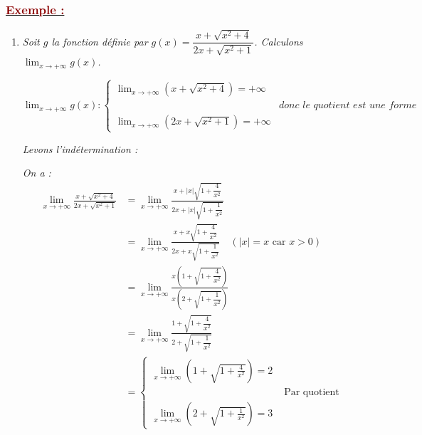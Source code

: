 \documentclass[12pt,a4paper]{article}
\begin{document}
\subsubsection*{\underline{\textcolor{darkred}{ Exemple : }}}
\begin{enumerate}
\item \textit{Soit $g$ la fonction définie par $g(x) = \dfrac{x + \sqrt{x^2 + 4}}{2x + \sqrt{x^2 + 1}}$. Calculons $\displaystyle \lim_{x \to +\infty} g(x)$.}
    
    \vspace{0.1cm}
    
    $
    \displaystyle \lim_{x \to +\infty} g(x):
    \begin{cases}
    \displaystyle \lim_{x \to +\infty} (x + \sqrt{x^2 + 4}) = +\infty\\[3mm]
    &\textit{donc le quotient est une forme indéterminée.}\\
    \displaystyle \lim_{x \to +\infty} (2x + \sqrt{x^2 + 1}) = +\infty
    \end{cases}
    $

    \textit{Levons l'indétermination :}
    
    \textit{On a :}
    \begin{align*}
        \displaystyle \lim_{x \to +\infty} \frac{x + \sqrt{x^2 + 4}}{2x + \sqrt{x^2 + 1}} &= \lim_{x \to +\infty} \frac{x + |x|\sqrt{1 + \dfrac{4}{x^2}}}{2x + |x|\sqrt{1 + \dfrac{1}{x^2}}} \\
        &= \lim_{x \to +\infty} \frac{x + x\sqrt{1 + \dfrac{4}{x^2}}}{2x + x\sqrt{1 + \dfrac{1}{x^2}}} \quad (|x| = x \text{ car } x > 0) \\
        &= \lim_{x \to +\infty} \frac{x \left( 1 + \sqrt{1 + \dfrac{4}{x^2}} \right)}{x \left( 2 + \sqrt{1 + \dfrac{1}{x^2}} \right)} \\
        &= \lim_{x \to +\infty} \frac{1 + \sqrt{1 + \dfrac{4}{x^2}}}{2 + \sqrt{1 + \dfrac{1}{x^2}}} \\
        &= \begin{cases}
    \displaystyle \lim_{x \to +\infty} \left( 1 + \sqrt{1 + \frac{4}{x^2}} \right) = 2 \\[3mm]
    &\text{ Par quotient }\\
    \displaystyle \lim_{x \to +\infty} \left( 2 + \sqrt{1 + \frac{1}{x^2}} \right) = 3
    \end{cases}
    \end{align*}
    
    \vspace{0.2cm}
    

\end{enumerate}
\end{document}
